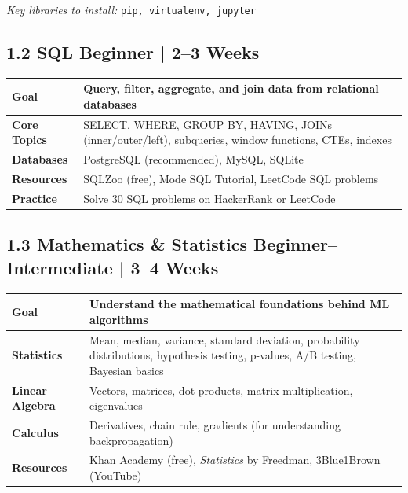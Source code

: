 \documentclass[a4paper,11pt]{article}
\begin{document}
\vspace{0.3cm}
\noindent\textit{Key libraries to install:} \texttt{pip, virtualenv, jupyter}

\subsection{1.2 SQL \hfill \small\normalfont\color{darkgray}Beginner | 2--3 Weeks}

\begin{tabular}{>{\bfseries}p{3cm} p{11.5cm}}
\toprule
Goal & Query, filter, aggregate, and join data from relational databases \\
\midrule
Core Topics & SELECT, WHERE, GROUP BY, HAVING, JOINs (inner/outer/left), subqueries, window functions, CTEs, indexes \\
Databases & PostgreSQL (recommended), MySQL, SQLite \\
Resources & SQLZoo (free), Mode SQL Tutorial, LeetCode SQL problems \\
Practice & Solve 30 SQL problems on HackerRank or LeetCode \\
\bottomrule
\end{tabular}

\subsection{1.3 Mathematics \& Statistics \hfill \small\normalfont\color{darkgray}Beginner--Intermediate | 3--4 Weeks}

\begin{tabular}{>{\bfseries}p{3cm} p{11.5cm}}
\toprule
Goal & Understand the mathematical foundations behind ML algorithms \\
\midrule
Statistics & Mean, median, variance, standard deviation, probability distributions, hypothesis testing, p-values, A/B testing, Bayesian basics \\
Linear Algebra & Vectors, matrices, dot products, matrix multiplication, eigenvalues \\
Calculus & Derivatives, chain rule, gradients (for understanding backpropagation) \\
Resources & Khan Academy (free), \textit{Statistics} by Freedman, 3Blue1Brown (YouTube) \\
\bottomrule
\end{tabular}

\end{document}
